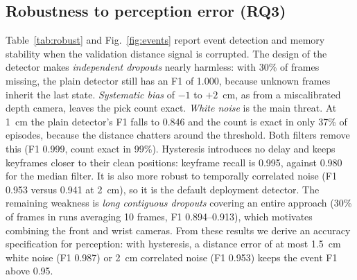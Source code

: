\subsection{Robustness to perception error (RQ3)}
\label{sec:res_robust}
Table~\ref{tab:robust} and Fig.~\ref{fig:events} report event detection and memory stability when the validation distance signal is corrupted. The design of the detector makes \emph{independent dropouts} nearly harmless: with 30\% of frames missing, the plain detector still has an F1 of 1.000, because unknown frames inherit the last state. \emph{Systematic bias} of $-1$ to $+2$~cm, as from a miscalibrated depth camera, leaves the pick count exact. \emph{White noise} is the main threat. At 1~cm the plain detector's F1 falls to 0.846 and the count is exact in only 37\% of episodes, because the distance chatters around the threshold. Both filters remove this (F1 0.999, count exact in 99\%). Hysteresis introduces no delay and keeps keyframes closer to their clean positions: keyframe recall is 0.995, against 0.980 for the median filter. It is also more robust to temporally correlated noise (F1 0.953 versus 0.941 at 2~cm), so it is the default deployment detector. The remaining weakness is \emph{long contiguous dropouts} covering an entire approach (30\% of frames in runs averaging 10 frames, F1 0.894--0.913), which motivates combining the front and wrist cameras. From these results we derive an accuracy specification for perception: with hysteresis, a distance error of at most 1.5~cm white noise (F1 0.987) or 2~cm correlated noise (F1 0.953) keeps the event F1 above 0.95.

